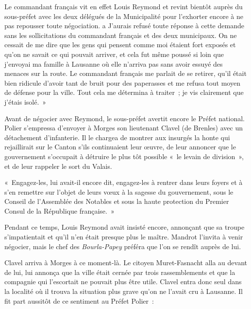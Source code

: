 \documentclass[french,twoside]{book} %
\newenvironment{quoteblock}%
  {\begin{quoting}}
  {\end{quoting}}
\newenvironment{quotebar}{%
    \def\FrameCommand{{\color{rubric!10!}\vrule width 0.5em} \hspace{0.9em}}%
    \def\OuterFrameSep{\itemsep} %
    \MakeFramed {\advance\hsize-\width \FrameRestore}
  }%
  {%
    \endMakeFramed
  }
\renewenvironment{quoteblock}%
  {%
    \savenotes
    \setstretch{0.9}
    \normalfont
    \begin{quotebar}
  }
  {%
    \end{quotebar}
    \spewnotes
  }
\begin{document}
\noindent Le commandant français vit en effet Louis Reymond et revint bientôt auprès du sous-préfet avec les deux délégués de la Municipalité pour l’exhorter encore à ne pas repousser toute négociation. a J’aurais refusé toute réponse à cette demande sans les sollicitations du commandant français et des deux municipaux. On ne cessait de me dire que les gens qui pensent comme moi étaient fort exposés et qu’on ne savait ce qui pouvait arriver, et cela fut même poussé si loin que j’envoyai ma famille à Lausanne où elle n’arriva pas sans avoir essuyé des menaces sur la route. Le commandant français me parlait de se retirer, qu’il était bien ridicule d’avoir tant de bruit pour des paperasses et me refusa tout moyen de défense pour la ville. Tout cela me détermina à traiter ; je vis clairement que j’étais isolé. »\par
Avant de négocier avec Reymond, le sous-préfet avertit encore le Préfet national. Polier s’empressa d’envoyer à Morges son lieutenant Clavel (de Brenles) avec un détachement d’infanterie. Il le chargea de montrer aux insurgés la honte qui rejaillirait sur le Canton s’ils continuaient leur œuvre, de leur annoncer que le gouvernement s’occupait à détruire le plus tôt possible « le levain de division », et de leur rappeler le sort du Valais.\par

\begin{quoteblock}
 \noindent « Engagez-les, lui avait-il encore dit, engagez-les à rentrer dans leurs foyers et à s’en remettre sur l’objet de leurs vœux à la sagesse du gouvernement, sous le Conseil de l’Assemblée des Notables et sous la haute protection du Premier Consul de la République française. »
 \end{quoteblock}

\noindent Pendant ce temps, Louis Reymond avait insisté encore, annonçant que sa troupe s’impatientait et qu’il n’en était presque plus le maître. Mandrot l’invita à venir négocier, mais le chef des \emph{Bourla-Papey} préféra que l’on se rendît auprès de lui.\par
Clavel arriva à Morges à ce moment-là. Le citoyen Muret-Fasnacht alla au devant de lui, lui annonça que la ville était cernée par trois rassemblements et que la compagnie qui l’escortait ne pouvait plus être utile. Clavel entra donc seul dans la localité où il trouva la situation plus grave qu’on ne l’avait cru à Lausanne. Il fit part aussitôt de ce sentiment au Préfet Polier :\par
\end{document}
